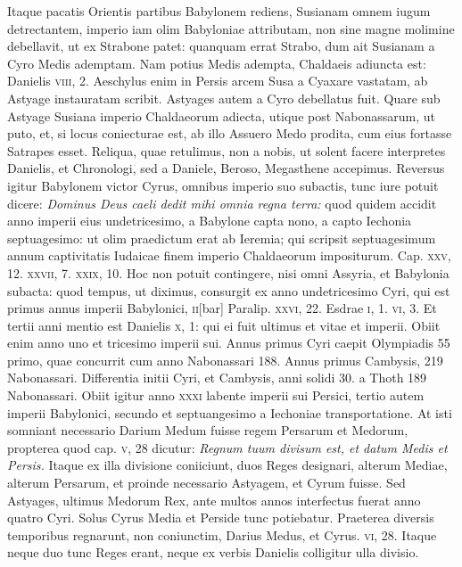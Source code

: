 Itaque pacatis Orientis partibus Babylonem rediens,
 Susianam omnem iugum
detrectantem, imperio iam olim Babyloniae attributam, non
sine magne molimine debellavit, ut ex Strabone patet: quanquam
errat Strabo, dum ait Susianam a Cyro Medis ademptam.
Nam
potius Medis adempta, Chaldaeis adiuncta est: Danielis \textsc{viii}, 2.
Aeschylus enim in Persis arcem Susa a Cyaxare vastatam, ab Astyage
instauratam scribit.
Astyages autem a Cyro debellatus fuit.
Quare sub Astyage Susiana imperio Chaldaeorum adiecta, utique
post Nabonassarum, ut puto, et, si locus coniecturae est, ab illo
Assuero Medo prodita, cum eius fortasse Satrapes esset.
Reliqua,
quae retulimus, non a nobis, ut solent facere interpretes Danielis,
et Chronologi, sed a Daniele, Beroso, Megasthene accepimus.
Reversus igitur Babylonem victor Cyrus, omnibus imperio suo
subactis, tunc iure potuit dicere: \textit{Dominus Deus caeli dedit mihi omnia
regna terra:} quod quidem accidit anno imperii eius undetricesimo,
a Babylone capta nono, a capto Iechonia septuagesimo: ut
olim praedictum erat ab Ieremia; qui scripsit septuagesimum annum
captivitatis Iudaicae finem imperio Chaldaeorum impositurum.
Cap. \textsc{xxv}, 12. \textsc{xxvii}, 7. \textsc{xxix}, 10.
Hoc non potuit contingere,
nisi omni Assyria, et Babylonia subacta: quod tempus,
ut diximus, consurgit ex anno undetricesimo Cyri, qui est primus
annus imperii Babylonici, \textsc{ii}[bar] Paralip. \textsc{xxvi}, 22.
Esdrae \textsc{i}, 1.
\textsc{vi}, 3.
Et tertii anni mentio est Danielis \textsc{x}, 1: qui ei fuit
 ultimus et
vitae et imperii.
Obiit enim anno uno et tricesimo imperii sui.
Annus primus Cyri caepit Olympiadis 55 primo, quae concurrit cum
anno Nabonassari 188.
Annus primus Cambysis, 219 Nabonassari.
Differentia initii Cyri, et Cambysis, anni solidi 30. a Thoth
189 Nabonassari.
Obiit igitur anno \textsc{xxxi} labente imperii sui Persici,
tertio autem imperii Babylonici, secundo et septuangesimo a
Iechoniae transportatione.
At isti somniant necessario Darium Medum
fuisse regem Persarum et Medorum, propterea quod cap. \textsc{v},
28 dicutur: \textit{Regnum tuum divisum est, et datum Medis et Persis.}
Itaque ex illa divisione coniiciunt, duos Reges designari, alterum
Mediae, alterum Persarum, et proinde necessario Astyagem, et
Cyrum fuisse.
Sed Astyages, ultimus Medorum Rex, ante multos
annos interfectus fuerat anno quatro Cyri.
Solus Cyrus Media et
Perside tunc potiebatur.
Praeterea diversis temporibus regnarunt,
non coniunctim, Darius Medus, et Cyrus. \textsc{vi}, 28.
Itaque neque
duo tunc Reges erant, neque ex verbis Danielis colligitur ulla divisio.

